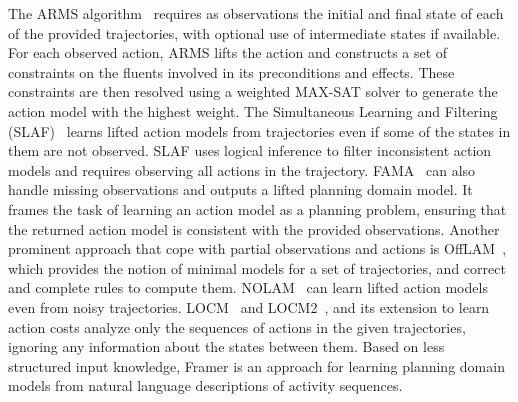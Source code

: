
The ARMS algorithm~\citep{yang2007learning} requires as observations the initial and final state of each of the provided trajectories, with optional use of intermediate states if available. For each observed action, ARMS lifts the action and constructs a set of constraints on the fluents involved in its preconditions and effects. These constraints are then resolved using a weighted MAX-SAT solver to generate the action model with the highest weight.
The Simultaneous Learning and Filtering (SLAF)~\citep{amir2008learning} learns lifted action models from trajectories even if some of the states in them are not observed. 
SLAF uses logical inference to filter inconsistent action models and requires observing all actions in the trajectory.  
FAMA~\citep{aineto2019learning} can also handle missing observations and outputs a lifted planning domain model. 
It frames the task of learning an action model as a planning problem, ensuring that the returned action model is consistent with the provided observations.
Another prominent approach that cope with partial observations and actions is OffLAM~\citep{LAMANNA2025104256}, which provides the notion of minimal models for a set of trajectories, and correct and complete rules to compute them.
NOLAM~\citep{Lamanna24} can learn lifted action models even from noisy trajectories. 
LOCM~\citep{cresswell2011generalised} and LOCM2~\citep{cresswell2013acquiring}, and its extension to learn action costs \citep{gregory2016domain} analyze only the sequences of actions in the given trajectories, ignoring any information about the states between them. 
Based on less structured input knowledge, Framer \citep{lindsay2017framer} is an approach for learning planning domain models from natural language descriptions of activity sequences.




